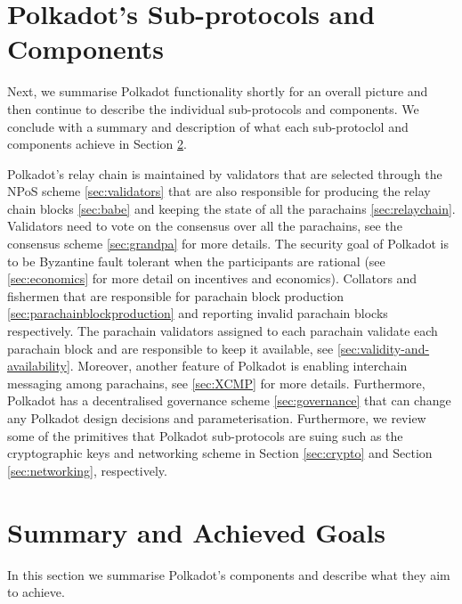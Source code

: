\section{Polkadot's Sub-protocols and Components}\label{sec:components}
Next, we summarise Polkadot functionality shortly for an overall picture and then continue to describe the individual sub-protocols and components. We conclude with a summary and description of what each sub-protoclol and components achieve in Section \ref{sec:summary}. 

Polkadot's relay chain is maintained by validators that are selected through the NPoS scheme \ref{sec:validators} that are also responsible for producing the relay chain blocks \ref{sec:babe} and keeping the state of all the parachains \ref{sec:relaychain}.
Validators need to vote on the consensus over all the parachains, see the consensus scheme \ref{sec:grandpa} for more details.
The security goal of Polkadot is to be Byzantine fault tolerant when the participants are rational (see \ref{sec:economics} for more detail on incentives and economics).
Collators and fishermen that are responsible for parachain block production \ref{sec:parachainblockproduction} and reporting invalid parachain blocks respectively.
The parachain validators assigned to each parachain validate each parachain block and are responsible to keep it available, see \ref{sec:validity-and-availability}. Moreover, another feature of Polkadot is enabling interchain messaging among parachains, see \ref{sec:XCMP} for more details.
Furthermore, Polkadot has a decentralised governance scheme \ref{sec:governance} that can change any Polkadot design decisions and parameterisation.
Furthermore, we review some of the primitives that Polkadot sub-protocols are suing such as the cryptographic keys and networking scheme in Section \ref{sec:crypto} and Section \ref{sec:networking}, respectively. 









\section{Summary and Achieved Goals}\label{sec:summary}
In this section we summarise Polkadot's components and describe what they aim to achieve. 

